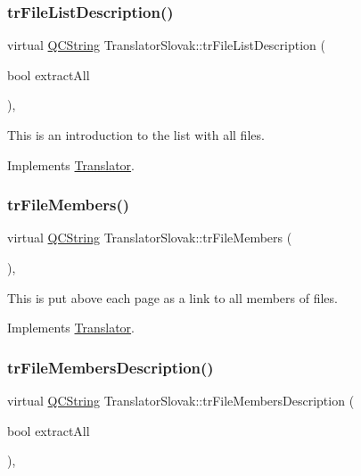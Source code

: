 \subsubsection{\texorpdfstring{trFileListDescription()}{trFileListDescription()}}
{\footnotesize\ttfamily virtual \mbox{\hyperlink{class_q_c_string}{Q\+C\+String}} Translator\+Slovak\+::tr\+File\+List\+Description (\begin{DoxyParamCaption}\item[{bool}]{extract\+All }\end{DoxyParamCaption})\hspace{0.3cm}{\ttfamily [inline]}, {\ttfamily [virtual]}}

This is an introduction to the list with all files. 

Implements \mbox{\hyperlink{class_translator}{Translator}}.

\mbox{\label{class_translator_slovak_abd7adffcc54ebb947319551023797ea4}} 
\subsubsection{\texorpdfstring{trFileMembers()}{trFileMembers()}}
{\footnotesize\ttfamily virtual \mbox{\hyperlink{class_q_c_string}{Q\+C\+String}} Translator\+Slovak\+::tr\+File\+Members (\begin{DoxyParamCaption}{ }\end{DoxyParamCaption})\hspace{0.3cm}{\ttfamily [inline]}, {\ttfamily [virtual]}}

This is put above each page as a link to all members of files. 

Implements \mbox{\hyperlink{class_translator}{Translator}}.

\mbox{\label{class_translator_slovak_a7f5e6ad6c1dbe60c810f92411504150b}} 
\subsubsection{\texorpdfstring{trFileMembersDescription()}{trFileMembersDescription()}}
{\footnotesize\ttfamily virtual \mbox{\hyperlink{class_q_c_string}{Q\+C\+String}} Translator\+Slovak\+::tr\+File\+Members\+Description (\begin{DoxyParamCaption}\item[{bool}]{extract\+All }\end{DoxyParamCaption})\hspace{0.3cm}{\ttfamily [inline]}, {\ttfamily [virtual]}}

